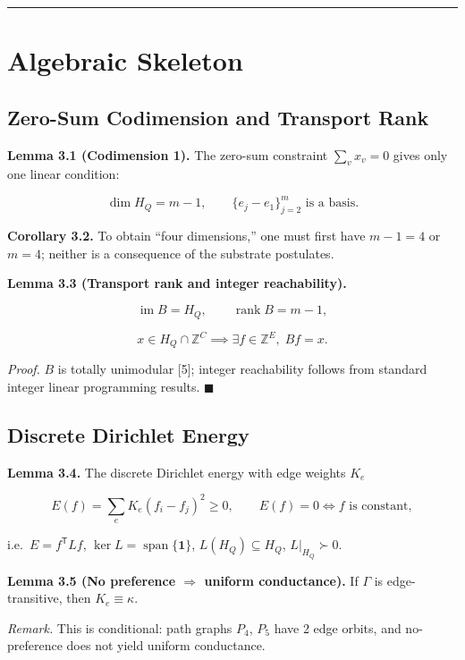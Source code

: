 \documentclass[
  11pt,
]{article}
\begin{document}
\begin{center}\rule{0.5\linewidth}{0.5pt}\end{center}

\section{Algebraic Skeleton}\label{algebraic-skeleton}

\subsection{Zero-Sum Codimension and Transport
Rank}\label{zero-sum-codimension-and-transport-rank}

\textbf{Lemma 3.1 (Codimension 1).} The zero-sum constraint
\(\sum_v x_v=0\) gives only one linear condition:

\[
\dim H_Q=m-1, \qquad \{e_j-e_1\}_{j=2}^m \text{ is a basis}.
\]

\textbf{Corollary 3.2.} To obtain ``four dimensions,'' one must first
have \(m-1=4\) or \(m=4\); neither is a consequence of the substrate
postulates.

\textbf{Lemma 3.3 (Transport rank and integer reachability).}

\[
\operatorname{im}B=H_Q, \qquad \operatorname{rank}B=m-1,
\]

\[
x\in H_Q\cap\mathbb Z^C \implies \exists f\in\mathbb Z^E,\; Bf=x.
\]

\emph{Proof.} \(B\) is totally unimodular {[}5{]}; integer reachability
follows from standard integer linear programming results.
\(\blacksquare\)

\subsection{Discrete Dirichlet
Energy}\label{discrete-dirichlet-energy}

\textbf{Lemma 3.4.} The discrete Dirichlet energy with edge weights
\(K_e\)

\[
E(f)=\sum_e K_e(f_i-f_j)^2 \ge 0, \qquad E(f)=0 \iff f \text{ is constant},
\]

i.e.~\(E=f^{\mathsf T}Lf\), \(\ker L=\operatorname{span}\{\mathbf 1\}\),
\(L(H_Q)\subseteq H_Q\), \(L|_{H_Q}\succ0\).

\textbf{Lemma 3.5 (No preference \(\Rightarrow\) uniform conductance).}
If \(\Gamma\) is edge-transitive, then \(K_e\equiv\kappa\).

\emph{Remark.} This is conditional: path graphs \(P_4\), \(P_5\) have 2
edge orbits, and no-preference does not yield uniform conductance.
\end{document}
